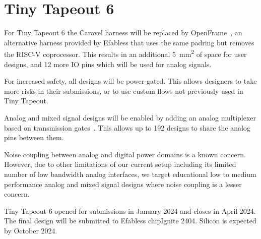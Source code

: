 \section{Tiny Tapeout 6}
\label{sec:tinytapeout6}

For Tiny Tapeout 6 the Caravel harness will be replaced by OpenFrame~\cite{openframe}, an alternative harness provided by Efabless that uses the same padring but removes the RISC-V coprocessor.
This results in an additional \qty{5}{\mm\squared} of space for user designs, and 12 more IO pins which will be used for analog signals.

For increased safety, all designs will be power-gated. This allows designers to take more risks in their submissions, or to use custom flows not previously used in Tiny Tapeout.

Analog and mixed signal designs will be enabled by adding an analog multiplexer based on transmission gates~\cite{transmissiongates}. 
This allows up to 192 designs to share the analog pins between them.

Noise coupling between analog and digital power domains is a known concern. However, due to other limitations of our current setup including its limited number of low bandwidth analog interfaces, we target educational low to medium performance analog and mixed signal designs where noise coupling is a lesser concern.

Tiny Tapeout 6 opened for submissions in January 2024 and closes in April 2024. The final design will be submitted to Efabless chipIgnite 2404. Silicon is expected by October 2024.
